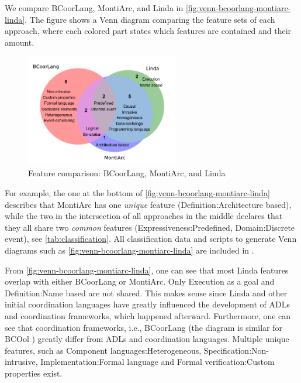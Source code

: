 \documentclass[runningheads]{llncs}
\begin{document}
We compare BCoorLang, MontiArc, and Linda in \autoref{fig:venn-bcoorlang-montiarc-linda}.
The figure shows a Venn diagram comparing the feature sets of each approach, where each colored part states which features are contained and their amount.

\begin{figure}[ht]
	\centering
	\includegraphics[width=0.6\textwidth]{images/venn_bcoorlang_montiarc_linda}
	\caption{Feature comparison: BCoorLang, MontiArc, and Linda}
	\label{fig:venn-bcoorlang-montiarc-linda}
\end{figure}

For example, the one at the bottom of \autoref{fig:venn-bcoorlang-montiarc-linda} describes that MontiArc has one \textit{unique} feature (\textsf{Definition:Architecture based}), while the two in the intersection of all approaches in the middle declares that they all share two \textit{common} features (\textsf{Expressiveness:Predefined, Domain:Discrete event}), see \autoref{tab:classification}.
All classification data and scripts to generate Venn diagrams such as \autoref{fig:venn-bcoorlang-montiarc-linda} are included in \cite{timkrauterArtifactsCoordination2024}.

From \autoref{fig:venn-bcoorlang-montiarc-linda}, one can see that most Linda features overlap with either BCoorLang or MontiArc.
Only \textsf{Execution} as a goal and \textsf{Definition:Name based} are not shared.
This makes sense since Linda and other initial coordination languages have greatly influenced the development of ADLs and coordination frameworks, which happened afterward.
Furthermore, one can see that coordination frameworks, i.e., BCoorLang (the diagram is similar for BCOol \cite{varalarsenBehavioralCoordinationOperator2015,varalarsenBCOolBehavioralCoordination2016}) greatly differ from ADLs and coordination languages.
Multiple unique features, such as \textsf{Component languages:Heterogeneous}, \textsf{Specification:Non-intrusive}, \textsf{Implementation:Formal language} and \textsf{Formal verification:Custom properties} exist.
\end{document}
